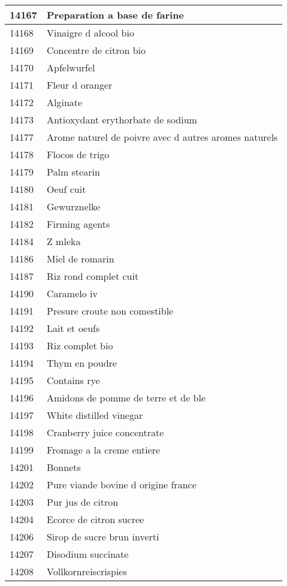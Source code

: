 \begin{longtable}{|l|l|}
14167 & Preparation a base de farine \\ \hline 
14168 & Vinaigre d alcool bio \\ \hline 
14169 & Concentre de citron bio \\ \hline 
14170 & Apfelwurfel \\ \hline 
14171 & Fleur d oranger \\ \hline 
14172 & Alginate \\ \hline 
14173 & Antioxydant erythorbate de sodium \\ \hline 
14177 & Arome naturel de poivre avec d autres aromes naturels \\ \hline 
14178 & Flocos de trigo \\ \hline 
14179 & Palm stearin \\ \hline 
14180 & Oeuf cuit \\ \hline 
14181 & Gewurznelke \\ \hline 
14182 & Firming agents \\ \hline 
14184 & Z mleka \\ \hline 
14186 & Miel de romarin \\ \hline 
14187 & Riz rond complet cuit \\ \hline 
14190 & Caramelo iv \\ \hline 
14191 & Presure croute non comestible \\ \hline 
14192 & Lait et oeufs \\ \hline 
14193 & Riz complet bio \\ \hline 
14194 & Thym en poudre \\ \hline 
14195 & Contains rye \\ \hline 
14196 & Amidons de pomme de terre et de ble \\ \hline 
14197 & White distilled vinegar \\ \hline 
14198 & Cranberry juice concentrate \\ \hline 
14199 & Fromage a la creme entiere \\ \hline 
14201 & Bonnets \\ \hline 
14202 & Pure viande bovine d origine france \\ \hline 
14203 & Pur jus de citron \\ \hline 
14204 & Ecorce de citron sucree \\ \hline 
14206 & Sirop de sucre brun inverti \\ \hline 
14207 & Disodium succinate \\ \hline 
14208 & Vollkornreiscrispies \\ \hline 

\end{longtable}
